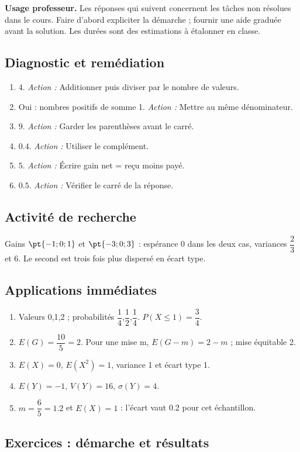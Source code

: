 \label{C08-CORR}
\textbf{Usage professeur.} Les réponses qui suivent concernent les tâches non résolues dans le cours. Faire d’abord expliciter la démarche ; fournir une aide graduée avant la solution. Les durées sont des estimations à étalonner en classe.
\subsection*{Diagnostic et remédiation}
\begin{enumerate}
\item $4$. \textit{Action :} Additionner puis diviser par le nombre de valeurs.
\item Oui : nombres positifs de somme 1. \textit{Action :} Mettre au même dénominateur.
\item $9$. \textit{Action :} Garder les parenthèses avant le carré.
\item $\num{0,4}$. \textit{Action :} Utiliser le complément.
\item $5$. \textit{Action :} Écrire gain net = reçu moins payé.
\item $\num{0,5}$. \textit{Action :} Vérifier le carré de la réponse.
\end{enumerate}
\subsection*{Activité de recherche}
Gains $\pt{-1;0;1}$ et $\pt{-3;0;3}$ : espérance 0 dans les deux cas, variances $\dfrac{2}{3}$ et 6. Le second est trois fois plus dispersé en écart type.
\subsection*{Applications immédiates}
\begin{enumerate}
\item Valeurs 0,1,2 ; probabilités $\dfrac{1}{4}$,$\dfrac{1}{2}$,$\dfrac{1}{4}$. $P(X\leq1)=\dfrac{3}{4}$.
\item $E(G)=\dfrac{10}{5}=2$. Pour une mise m, $E(G-m)=2-m$ ; mise équitable 2.
\item $E(X)=0$, $E(X^2)=1$, variance 1 et écart type 1.
\item $E(Y)=-1$, $V(Y)=16$, $\sigma(Y)=4$.
\item $m=\dfrac{6}{5}=\num{1,2}$ et $E(X)=1$ : l’écart vaut \num{0,2} pour cet échantillon.
\end{enumerate}
\subsection*{Exercices : démarche et résultats}
